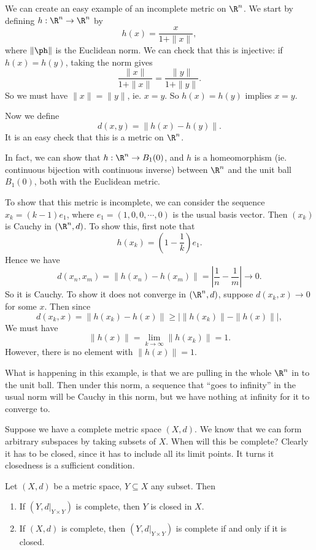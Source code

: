 \documentclass[a4paper]{article}
\begin{document}
\begin{eg}
  We can create an easy example of an incomplete metric on $\R^n$. We start by defining $h: \R^n \to \R^n$ by
  \[
    h(x) = \frac{x}{1 + \|x\|},
  \]
  where $\|\ph\|$ is the Euclidean norm. We can check that this is injective: if $h(x) = h(y)$, taking the norm gives
  \[
    \frac{\|x\|}{1 + \|x\|} = \frac{\|y\|}{ 1 + \|y\|}.
  \]
  So we must have $\|x\| = \|y\|$, ie. $x = y$. So $h(x) = h(y)$ implies $x = y$.

  Now we define
  \[
    d(x, y) = \|h(x) - h(y)\|.
  \]
  It is an easy check that this is a metric on $\R^n$.

  In fact, we can show that $h: \R^n \to B_1(0)$, and $h$ is a homeomorphism (ie. continuous bijection with continuous inverse) between $\R^n$ and the unit ball $B_1(0)$, both with the Euclidean metric.

  To show that this metric is incomplete, we can consider the sequence $x_k = (k - 1) e_1$, where $e_1 = (1, 0, 0, \cdots, 0)$ is the usual basis vector. Then $(x_k)$ is Cauchy in $(\R^n, d)$. To show this, first note that
  \[
    h(x_k) = \left(1 - \frac{1}{k}\right) e_1.
  \]
  Hence we have
  \[
    d(x_n, x_m) = \|h(x_n) - h(x_m)\| = \left|\frac{1}{n} - \frac{1}{m}\right| \to 0.
  \]
  So it is Cauchy. To show it does not converge in $(\R^n, d)$, suppose $d(x_k, x) \to 0$ for some $x$. Then since
  \[
    d(x_k, x) = \|h(x_k) - h(x)\| \geq \big| \|h(x_k)\| - \|h(x)\|\big|,
  \]
  We must have
  \[
    \|h(x)\| = \lim_{k \to \infty} \|h(x_k)\| = 1.
  \]
  However, there is no element with $\|h(x)\| = 1$.
\end{eg}
What is happening in this example, is that we are pulling in the whole $\R^n$ in to the unit ball. Then under this norm, a sequence that ``goes to infinity'' in the usual norm will be Cauchy in this norm, but we have nothing at infinity for it to converge to.

Suppose we have a complete metric space $(X, d)$. We know that we can form arbitrary subspaces by taking subsets of $X$. When will this be complete? Clearly it has to be closed, since it has to include all its limit points. It turns it closedness is a sufficient condition.
\begin{thm}
  Let $(X, d)$ be a metric space, $Y \subseteq X$ any subset. Then
  \begin{enumerate}
    \item If $(Y, d|_{Y\times Y})$ is complete, then $Y$ is closed in $X$.
    \item If $(X, d)$ is complete, then $(Y, d|_{Y\times Y})$ is complete if and only if it is closed.
  \end{enumerate}
\end{thm}
\end{document}
